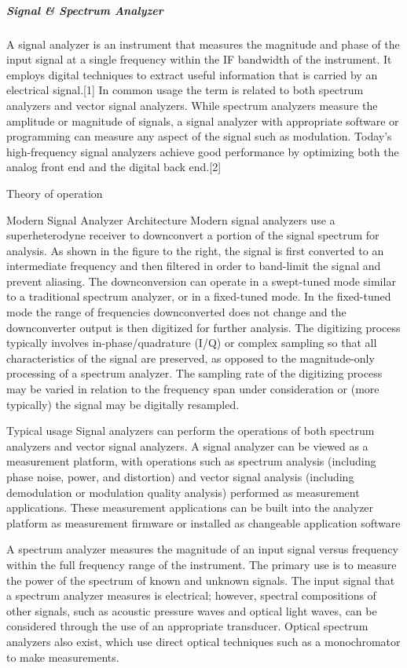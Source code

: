 \subparagraph{Signal \& Spectrum Analyzer}

	A signal analyzer is an instrument that measures the magnitude and phase of the input signal at a single frequency within the IF bandwidth of the instrument. It employs digital techniques to extract useful information that is carried by an electrical signal.[1] In common usage the term is related to both spectrum analyzers and vector signal analyzers. While spectrum analyzers measure the amplitude or magnitude of signals, a signal analyzer with appropriate software or programming can measure any aspect of the signal such as modulation. Today’s high-frequency signal analyzers achieve good performance by optimizing both the analog front end and the digital back end.[2]

Theory of operation

Modern Signal Analyzer Architecture
Modern signal analyzers use a superheterodyne receiver to downconvert a portion of the signal spectrum for analysis. As shown in the figure to the right, the signal is first converted to an intermediate frequency and then filtered in order to band-limit the signal and prevent aliasing. The downconversion can operate in a swept-tuned mode similar to a traditional spectrum analyzer, or in a fixed-tuned mode. In the fixed-tuned mode the range of frequencies downconverted does not change and the downconverter output is then digitized for further analysis. The digitizing process typically involves in-phase/quadrature (I/Q) or complex sampling so that all characteristics of the signal are preserved, as opposed to the magnitude-only processing of a spectrum analyzer. The sampling rate of the digitizing process may be varied in relation to the frequency span under consideration or (more typically) the signal may be digitally resampled.

Typical usage
Signal analyzers can perform the operations of both spectrum analyzers and vector signal analyzers. A signal analyzer can be viewed as a measurement platform, with operations such as spectrum analysis (including phase noise, power, and distortion) and vector signal analysis (including demodulation or modulation quality analysis) performed as measurement applications. These measurement applications can be built into the analyzer platform as measurement firmware or installed as changeable application software

	A spectrum analyzer measures the magnitude of an input signal versus frequency within the full frequency range of the instrument. The primary use is to measure the power of the spectrum of known and unknown signals. The input signal that a spectrum analyzer measures is electrical; however, spectral compositions of other signals, such as acoustic pressure waves and optical light waves, can be considered through the use of an appropriate transducer. Optical spectrum analyzers also exist, which use direct optical techniques such as a monochromator to make measurements.

